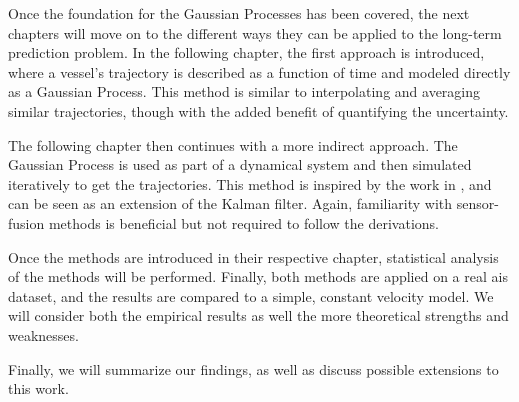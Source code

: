 Once the foundation for the Gaussian Processes has been covered, the next chapters will move on to the different ways they can be applied to the long-term prediction problem. In the following chapter, the first approach is introduced, where a vessel's trajectory is described as a function of time and modeled directly as a Gaussian Process. This method is similar to interpolating and averaging similar trajectories, though with the added benefit of quantifying the uncertainty.

The following chapter then continues with a more indirect approach. The Gaussian Process is used as part of a dynamical system and then simulated iteratively to get the trajectories. This method is inspired by the work in \cite{pedestrian,gpekf}, and can be seen as an extension of the Kalman filter. Again, familiarity with sensor-fusion methods is beneficial but not required to follow the derivations.

Once the methods are introduced in their respective chapter, statistical analysis of the methods will be performed. Finally, both methods are applied on a real \acrshort{ais} dataset, and the results are compared to a simple, constant velocity model.  We will consider both the empirical results as well the more theoretical strengths and weaknesses. 

Finally, we will summarize our findings, as well as discuss possible extensions to this work.



